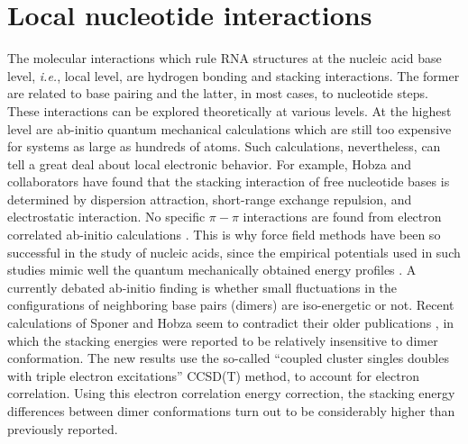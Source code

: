 \section{Local nucleotide interactions}
The molecular interactions which rule RNA structures at the nucleic
acid base level, \textit{i.e.}, local level, are hydrogen bonding and
stacking interactions. The former are related to base pairing and
the latter, in most cases, to nucleotide steps. These interactions
can be explored theoretically at various levels. At the highest
level are ab-initio quantum mechanical calculations which are still
too expensive for systems as large as hundreds of atoms. Such
calculations, nevertheless, can tell a great deal about local
electronic behavior. For example, Hobza and collaborators have found
that the stacking interaction of free nucleotide bases is determined
by dispersion attraction, short-range exchange repulsion, and electrostatic
interaction. No specific $\pi-\pi$ interactions are found from
electron correlated ab-initio calculations \cite{sponer1996,
sponer1997}. This is why force field methods have been so successful
in the study of nucleic acids, since the empirical potentials used
in such studies mimic well the quantum mechanically obtained energy
profiles \cite{tung2004, sponer2000}.
A currently debated ab-initio finding is whether small fluctuations
in the configurations of neighboring base pairs (dimers) are
iso-energetic or not. Recent calculations of Sponer and Hobza
\cite{sponer2006} seem to contradict their older publications
\cite{sponer2000, hobza2002}, in which the stacking energies were
reported to be relatively insensitive to dimer conformation. The new
results use the so-called ``coupled cluster singles doubles with triple electron
excitations'' CCSD(T) method, to account for electron correlation.
Using this electron correlation energy correction, the stacking
energy differences between dimer conformations turn out to be
considerably higher than previously reported.


